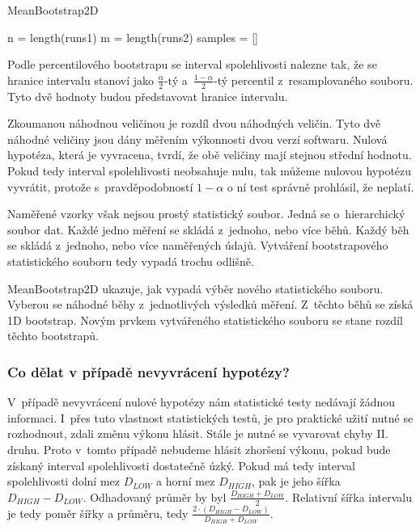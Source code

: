 \begin{algorithm}[!ht]
    \caption{MeanBootstrap2D}
    
    n = length(runs1)\;
    m = length(runs2)\;
    samples = []\;
    
    
    \;
\end{algorithm}

Podle percentilového bootstrapu se interval spolehlivosti nalezne tak, že se hranice intervalu stanoví jako $\frac{\alpha}{2}$-tý
a~$\frac{1-\alpha}{2}$-tý percentil z~resamplovaného souboru. Tyto dvě hodnoty budou představovat hranice intervalu.

Zkoumanou náhodnou veličinou je rozdíl dvou náhodných veličin. Tyto dvě náhodné veličiny jsou dány měřením
výkonnosti dvou verzí softwaru. Nulová hypotéza, která je vyvracena, tvrdí, že obě veličiny mají stejnou střední hodnotu.
Pokud tedy interval spolehlivosti neobsahuje nulu, tak můžeme nulovou hypotézu vyvrátit, protože s~pravděpodobností
$1-\alpha$ o ní test správně prohlásil, že neplatí.

Naměřené vzorky však nejsou prostý statistický soubor. Jedná se o~hierarchický soubor dat.
Každé jedno měření se skládá z~jednoho, nebo více běhů. Každý běh se skládá z~jednoho, nebo více naměřených údajů.
Vytváření bootstrapového statistického souboru tedy vypadá trochu odlišně.

MeanBootstrap2D ukazuje, jak vypadá výběr nového statistického souboru. Vyberou
se náhodné běhy z~jednotlivých výsledků měření. Z~těchto běhů se získá 1D bootstrap.
Novým prvkem vytvářeného statistického souboru se stane rozdíl těchto bootstrapů.

\subsubsection{Co dělat v případě nevyvrácení hypotézy?}

V~případě nevyvrácení nulové hypotézy nám statistické testy nedávají žádnou informaci.
I~přes tuto vlastnost statistických testů, je pro praktické užití nutné se rozhodnout, zdali
změnu výkonu hlásit. Stále je nutné se vyvarovat chyby II. druhu. Proto v~tomto případě nebudeme hlásit zhoršení výkonu,
pokud bude získaný interval spolehlivosti dostatečně úzký. Pokud má tedy interval spolehlivosti
dolní mez $D_{LOW}$ a horní mez $D_{HIGH}$, pak je jeho šířka $D_{HIGH}-D_{LOW}$. Odhadovaný průměr by byl $\frac{D_{HIGH}+D_{LOW}}{2}$.
Relativní šířka intervalu je tedy poměr šířky a průměru, tedy $\frac{2\cdot(D_{HIGH}-D_{LOW})}{D_{HIGH}+D_{LOW}}$.

